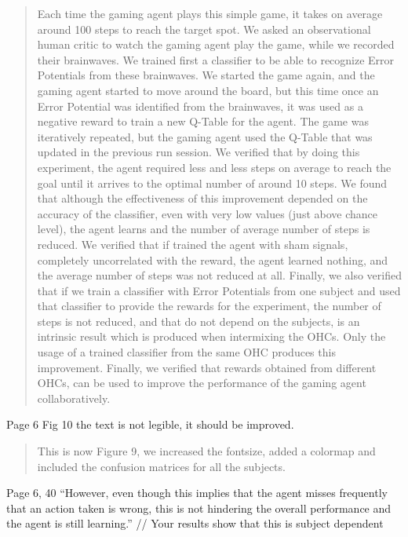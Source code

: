 \documentclass[journal,onecolumn,12pt]{IEEEtran}
\begin{document}
\vspace{2em}
\begin{quotation}
{\color{blue}
Each time the gaming agent plays this simple game, it takes on average around 100 steps to reach the target spot.   We asked an observational human critic to watch the gaming agent play the game, while we recorded their brainwaves.  We trained first a classifier to be able to recognize Error Potentials from these brainwaves.  We started the game again, and the gaming agent started to move around the board, but this time once an Error Potential was identified from the brainwaves, it was used as a negative reward to train a new Q-Table for the agent.  The game was iteratively repeated, but the gaming agent used the Q-Table that was updated in the previous run session.
We verified that by doing this experiment, the agent required less and less steps on average to reach the goal until it arrives to the optimal number of around 10 steps.  We found that although the effectiveness of this improvement depended on the accuracy of the classifier, even with very low values (just above chance level), the agent learns and the number of average number of steps is reduced.
We verified that if trained the agent with sham signals, completely uncorrelated with the reward, the agent learned nothing, and the average number of steps was not reduced at all.
Finally, we also verified that if we train a classifier with Error Potentials from one subject and used that classifier to provide the rewards for the experiment, the number of steps is not reduced, and that do not depend on the subjects, is an intrinsic result which is produced when intermixing the OHCs.  Only the usage of a trained classifier from the same OHC produces this improvement.
Finally, we verified that rewards obtained from different OHCs, can be used to improve the performance of the gaming agent collaboratively.
}
\end{quotation}
\vspace{2em}

Page 6 Fig 10 the text is not legible, it should be improved.

\vspace{2em}
\begin{quotation}
{\color{blue}
This is now Figure 9, we increased the fontsize, added a colormap and included the confusion matrices for all the subjects.
}
\end{quotation}
\vspace{2em}

Page 6, 40
“However, even though this implies that the agent misses frequently that an action taken is wrong, this is not hindering the overall performance and the agent is still learning.”
// Your results show that this is subject dependent
\end{document}
